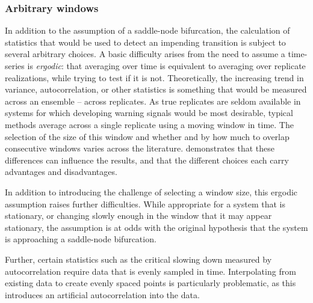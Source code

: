 \documentclass[authoryear,review,11pt]{elsarticle}
\begin{document}
\subsubsection*{Arbitrary windows}
In addition to the assumption of a saddle-node bifurcation, 
the calculation of statistics that would be used to detect an impending transition is subject to several arbitrary choices.
A basic difficulty arises from the need to assume a time-series is \emph{ergodic}: 
that averaging over time is equivalent to averaging over replicate realizations,
while trying to test if it is not.
Theoretically, the increasing trend in variance, autocorrelation, or other statistics
is something that would be measured across an ensemble -- across replicates. %
As true replicates are seldom available in systems for which developing warning signals would be most desirable,
typical methods average across a single replicate using a moving window in time.
The selection of the size of this window and whether and by how much to overlap consecutive windows
varies across the literature.
\citet{Lenton2012} demonstrates that these differences can influence the results,
and that the different choices each carry advantages and disadvantages.

In addition to introducing the challenge of selecting a window size,
this ergodic assumption raises further difficulties.
While appropriate for a system that is stationary,
or changing slowly enough in the window that it may appear stationary,
the assumption is at odds with the original hypothesis
that the system is approaching a saddle-node bifurcation.

Further, certain statistics such as the critical slowing down measured by autocorrelation
require data that is evenly sampled in time.
Interpolating from existing data to create evenly spaced points is particularly problematic,
as this introduces an artificial autocorrelation into the data.
\end{document}
